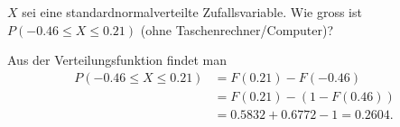 $X$ sei eine standardnormalverteilte Zufallsvariable. Wie gross
ist $P(-0.46\le X\le 0.21)$ (ohne Taschenrechner/Computer)?

\begin{loesung}
Aus der Verteilungsfunktion findet man
\begin{align*}
P(-0.46\le X\le 0.21)
&=F(0.21)-F(-0.46)
\\
&=F(0.21)-(1-F(0.46))
\\
&=0.5832+0.6772-1=0.2604.
\end{align*}
\end{loesung}


